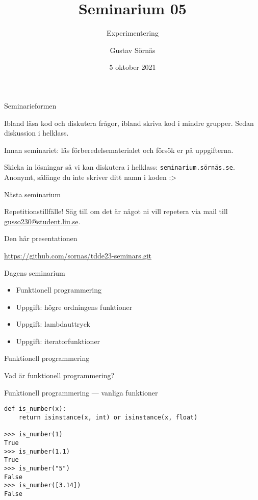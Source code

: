 \documentclass{beamer}
\title{Seminarium 05}
\subtitle{Experimentering}
\date{5 oktober 2021}
\author{Gustav Sörnäs}
\begin{document}
  \frame{\titlepage}

  \begin{frame}{Seminarieformen}

    Ibland läsa kod och diskutera frågor, ibland skriva kod i mindre grupper.
    Sedan diskussion i helklass.

    Innan seminariet: läs förberedelsematerialet och försök er på uppgifterna.

    Skicka in lösningar så vi kan diskutera i helklass:
    \texttt{seminarium.sörnäs.se}. Anonymt, sålänge du inte skriver ditt namn i
    koden :>

  \end{frame}

  \begin{frame}{Nästa seminarium}

    Repetitionstillfälle! Säg till om det är något ni vill repetera via mail
    till \url{gusso230@student.liu.se}.

  \end{frame}

  \begin{frame}{Den här presentationen}

    \url{https://github.com/sornas/tdde23-seminars.git}

  \end{frame}

  \begin{frame}{Dagens seminarium}

    \begin{itemize}
      \item Funktionell programmering
      \item Uppgift: högre ordningens funktioner
      \item Uppgift: lambdauttryck
      \item Uppgift: iteratorfunktioner
    \end{itemize}

  \end{frame}

  \begin{frame}{Funktionell programmering}

    Vad är funktionell programmering?

  \end{frame}

  \begin{frame}[fragile]{Funktionell programmering --- vanliga funktioner}

    \begin{lstlisting}
def is_number(x):
    return isinstance(x, int) or isinstance(x, float)

>>> is_number(1)
True
>>> is_number(1.1)
True
>>> is_number("5")
False
>>> is_number([3.14])
False
    \end{lstlisting}

  \end{frame}
\end{document}
